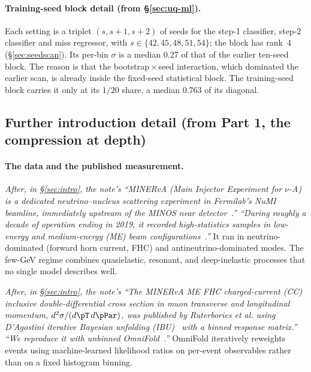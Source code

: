 \paragraph{Training-seed block detail (from \S\ref{sec:uq-ml}).}
Each setting is a triplet $(s,s{+}1,s{+}2)$ of seeds for the step-1 classifier, step-2 classifier and miss regressor, with $s\in\{42,45,48,51,54\}$; the block has rank~4 (\S\ref{sec:seedscan}).
Its per-bin $\sigma$ is a median 0.27 of that of the earlier ten-seed block. The reason is that the bootstrap\,$\times$\,seed interaction, which dominated the earlier scan, is already inside the fixed-seed statistical block. The training-seed block carries it only at its $1/20$ share, a median 0.763 of its diagonal.


\subsection{Further introduction detail (from Part 1, the compression at depth)}
\paragraph{The data and the published measurement.}
\emph{After, in \S\ref{sec:intro}, the note's ``MINERvA (Main Injector Experiment for $\nu$-A) is a dedicated neutrino--nucleus scattering experiment in Fermilab's NuMI beamline, immediately upstream of the MINOS near detector~\cite{MINERvA:2013zvz}.'' ``During roughly a decade of operation ending in 2019, it recorded high-statistics samples in low-energy and medium-energy (ME) beam configurations~\cite{MINERvA:2016iqn}.''}
It ran in neutrino-dominated (forward horn current, FHC) and antineutrino-dominated modes. The few-GeV regime combines quasielastic, resonant, and deep-inelastic processes that no single model describes well.

\emph{After, in \S\ref{sec:intro}, the note's ``The MINERvA ME FHC charged-current (CC) inclusive double-differential cross section in muon transverse and longitudinal momentum, $d^{2}\sigma/(d\pT\,d\pPar)$, was published by Ruterbories \emph{et al.} \cite{MINERvA:2021owq} using D'Agostini iterative Bayesian unfolding (IBU)~\cite{DAgostini:1994fjx} with a binned response matrix.'' ``We reproduce it with \emph{unbinned} OmniFold~\cite{Andreassen:2019cjw, Andreassen:2021zzk}.''}
OmniFold iteratively reweights events using machine-learned likelihood ratios on per-event observables rather than on a fixed histogram binning.

